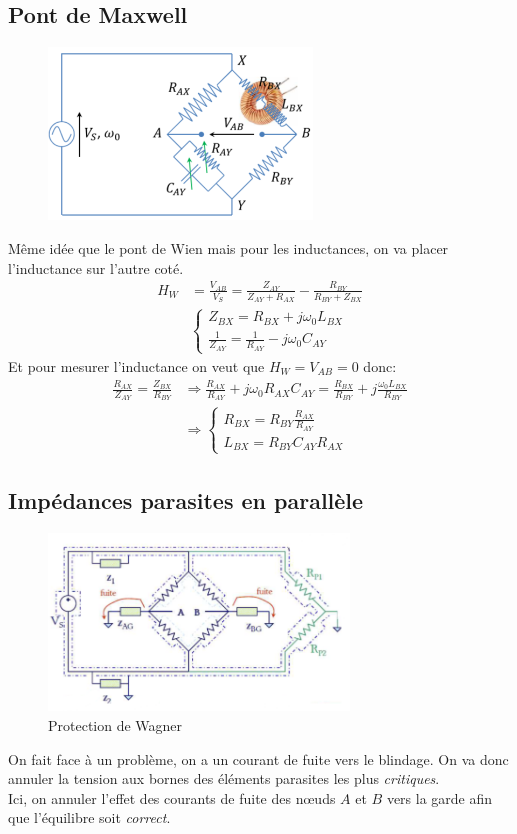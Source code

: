 \documentclass{report}
\begin{document}
\subsection{Pont de Maxwell}
\begin{figure}[H]
\centering
\includegraphics[width=7cm]{img/Maxwell.png}
\end{figure}
Même idée que le pont de Wien mais pour les inductances, on va placer l'inductance sur l'autre coté.
\begin{align*}
H_W &= \frac{V_{AB}}{V_S} = \frac{Z_{AY}}{Z_{AY} + R_{AX}} - \frac{R_{BY}}{R_{BY} + Z_{BX}}\\
& \begin{cases}
Z_{BX} = R_{BX} + j \omega_0 L_{BX}\\
\frac{1}{Z_{AY}} = \frac{1}{R_{AY}} - j \omega_0 C_{AY}
\end{cases}
\end{align*}
Et pour mesurer l'inductance on veut que $H_W = V_{AB} = 0$ donc:
\begin{align*}
\frac{R_{AX}}{Z_{AY}} = \frac{Z_{BX}}{R_{BY}} & \Longrightarrow \frac{R_{AX}}{R_{AY}} + j \omega_0 R_{AX} C_{AY} = \frac{R_{BX}}{R_{BY}} + j \frac{\omega_0 L_{BX}}{R_{BY}}\\
& \Longrightarrow \begin{cases}
R_{BX} = R_{BY}\frac{R_{AX}}{R_{AY}}\\
L_{BX} = R_{BY}C_{AY}R_{AX}
\end{cases}
\end{align*}

\subsection{Impédances parasites en parallèle}
\begin{figure}[H]
\centering
\includegraphics[width=8cm]{img/Wagner.png}
\caption{Protection de Wagner}
\end{figure}
On fait face à un problème, on a un courant de fuite vers le blindage. On va donc annuler la tension aux bornes des éléments parasites les plus \textit{critiques}.\\
Ici, on annuler l'effet des courants de fuite des nœuds $A$ et $B$ vers la garde afin que l'équilibre soit \textit{correct}.
\end{document}
